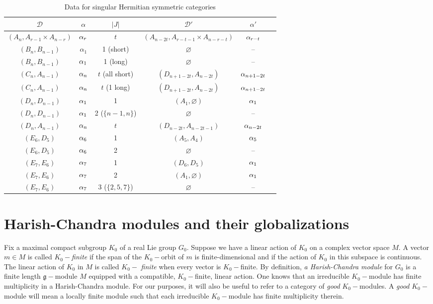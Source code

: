 \begin{table}[H] 
\begin{tabular}{cccccc}
$\mathcal{D}$ &  $\alpha$ & $|J|$ & $\mathcal{D}'$ & $\alpha'$    \\[2pt] \hline 
$(A_n,A_{r-1}\times A_{n-r})$ & $\alpha_r$   & $t$ & $(A_{n-2t},A_{r-t-1}\times A_{n-r-t})$ & $\alpha_{r-t}$ \\
$(B_n,B_{n-1})$ & $\alpha_1$   & 1 (short) & $\varnothing$  & --  \\
$(B_n,B_{n-1})$ & $\alpha_1$   & 1 (long) & $\varnothing$ & --  \\
$(C_n,A_{n-1})$ & $\alpha_n$   & $t$ (all short) & $(D_{n+1-2t},A_{n-2t})$  & $\alpha_{n+1-2t}$  \\
$(C_n,A_{n-1})$ & $\alpha_n$   & $t$ (1 long) & $(D_{n+1-2t},A_{n-2t})$  & $\alpha_{n+1-2t}$ \\
$(D_n,D_{n-1})$ & $\alpha_1$   & 1 & $(A_1,\varnothing)$  & $\alpha_1$  \\
$(D_n,D_{n-1})$ & $\alpha_1$   & 2 ($\{n-1,n\}$) & $\varnothing$  & --   \\
$(D_n,A_{n-1})$ & $\alpha_n$   & $t$ & $(D_{n-2t},A_{n-2t-1})$  & $\alpha_{n-2t}$  \\
$(E_6,D_5)$ & $\alpha_6$   & 1 & $(A_5,A_4)$  & $\alpha_5$ \\
$(E_6,D_5)$ & $\alpha_6$   & 2 & $\varnothing$  & --  \\
$(E_7,E_6)$ & $\alpha_7$   & 1 & $(D_6,D_5)$  & $\alpha_1$   \\
$(E_7,E_6)$ & $\alpha_7$   & 2 & $(A_1,\varnothing)$  & $\alpha_1$  \\
$(E_7,E_6)$ & $\alpha_7$   & 3 ($\{2,5,7\}$) & $\varnothing$  & --   \\[2pt] \hline
\end{tabular}
\medskip
\caption{Data for singular Hermitian symmetric categories}\label{tbl:sing}
\end{table}


\section{Harish-Chandra modules and their globalizations}


Fix a maximal compact subgroup $K_{0}$ of a real Lie group $G_{0}$. Suppose we have
a linear action of $K_{0}$ on a complex vector space $M$. A vector $m\in M$
is called $K_{0}-$\emph{finite} if the span of the $K_{0}-$orbit of $m$ is
finite-dimensional and if the action of $K_{0}$ in this subspace is
continuous. The linear action of $K_{0}$ in $M$ is called $K_{0}-$\emph{%
finite }when every vector is $K_{0}-$finite. By definition, \emph{a
Harish-Chandra module} for $G_{0}$ is a finite length $\mathfrak{g}-$module $%
M$ equipped with a compatible, $K_{0}-$finite, linear action. One knows that
an irreducible $K_{0}-$module has finite multiplicity in a Harish-Chandra
module. For our purposes, it will also be useful to refer to a category of
\emph{good }$K_{0}-$modules. A \emph{good }$K_{0}-$module will mean a
locally finite module such that each irreducible $K_{0}-$module has finite
multiplicity therein.

